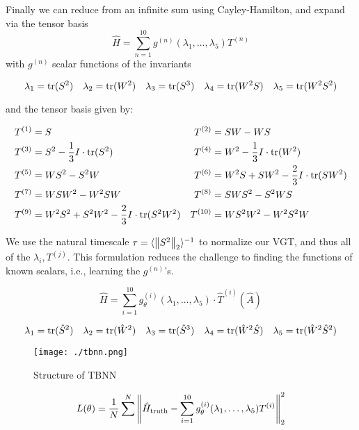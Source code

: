 Finally we can reduce from an infinite sum using Cayley-Hamilton, and expand via the tensor basis\cite{zheng1993}
\begin{equation}
  \hat{H} = \sum_{n=1}^{10} g^{(n)}(\lambda_1, \dots, \lambda_5)T^{(n)}
\end{equation}
with $g^{(n)}$ scalar functions of the invariants
\begin{small}
  \begin{equation*}
    \lambda_1 = \text{tr}(S^2) \quad \lambda_2 = \text{tr}(W^2) \quad \lambda_3 = \text{tr}(S^3) \quad \lambda_4 = \text{tr}(W^2S) \quad \lambda_5 = \text{tr}(W^2S^2)
  \end{equation*}
\end{small}
and the tensor basis given by:
\begin{small}
  \begin{align*}
    &T^{(1)} = S &T^{(2)} &= SW-WS\\
    &T^{(3)} = S^2 - \frac{1}{3}I \cdot \text{tr}(S^2) &T^{(4)} &= W^2 - \frac{1}{3}I \cdot \text{tr}(W^2)\\
    &T^{(5)} = WS^2 - S^2W &T^{(6)} &= W^2S + SW^2 - \frac{2}{3}I \cdot \text{tr}(SW^2)\\
    &T^{(7)} = WSW^2-W^2SW &T^{(8)} &= SWS^2 - S^2WS\\
    &T^{(9)} = W^2S^2 + S^2W^2 - \frac{2}{3}I \cdot \text{tr}(S^2W^2) &T^{(10)} &= WS^2W^2 - W^2S^2W
  \end{align*}
\end{small}
We use the natural timescale $\tau = \langle \left\lVert S^2\right\rVert_2 \rangle^{-1}$ to normalize our VGT, and thus all of the $\lambda_i, T^{(j)}$.
This formulation reduces the challenge to finding the functions of known scalars, i.e., learning the $g^{(n)}$'s.

\begin{equation}
  \hat{H} = \sum_{i=1}^{10} g_{\theta}^{(i)}(\lambda_1, \dots, \lambda_5)\cdot \hat{T}^{(i)}(\hat{A})
\end{equation}

\begin{small}
  \begin{equation*}
    \lambda_1 = \text{tr}(\hat{S}^2) \quad \lambda_2 = \text{tr}(\hat{W}^2) \quad \lambda_3 = \text{tr}(\hat{S}^3) \quad \lambda_4 = \text{tr}(\hat{W}^2\hat{S}) \quad \lambda_5 = \text{tr}(\hat{W}^2\hat{S}^2)
  \end{equation*}
\end{small}
\begin{figure}
  \centering
  \texttt{[image: ./tbnn.png]}
  \caption{Structure of TBNN}
  \label{fig:tbnn}
\end{figure}

\begin{equation}
  L(\theta) = \frac{1}{N}\sum^N\left\lVert\hat{H}_{\text{truth}} - \sum_{i=1}^{10}g_\theta^{(i)}(\lambda_1, \dots, \lambda_5)T^{(i)}\right\rVert_2^2
\end{equation}


